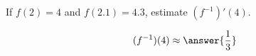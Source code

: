 \documentclass{ximera}
\author{Steven Gubkin}
\begin{document}
\begin{exercise}

If $f(2) = 4$ and $f(2.1) = 4.3$, estimate $(f^{-1})'(4)$.

\[ (f^{-1})(4) \approx \answer{\frac{1}{3}} \]

\end{exercise}
\end{document}

